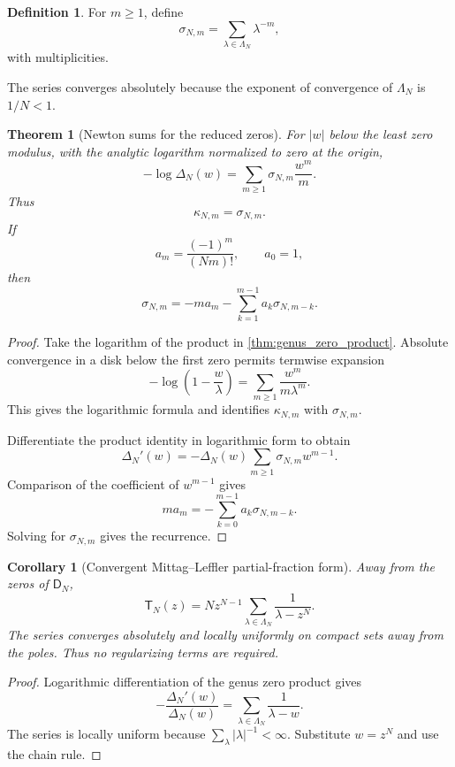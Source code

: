 \documentclass[11pt,letterpaper]{article}
\newtheorem{theorem}{Theorem}[section]
\newtheorem{corollary}[corollary]{Corollary}
\theoremstyle{definition}
\newtheorem{definition}[definition]{Definition}
\theoremstyle{remark}
\newcommand{\Dfun}{\mathsf D}
\newcommand{\Tfun}{\mathsf T}
\begin{document}
\begin{definition}\label{def:zero_power_sums}
For $m\geq1$, define
\[
\sigma_{N,m}
=
\sum_{\lambda\in\Lambda_N}\lambda^{-m},
\]
with multiplicities.
\end{definition}

The series converges absolutely because the exponent of convergence of $\Lambda_N$ is $1/N<1$.

\begin{theorem}[Newton sums for the reduced zeros]\label{thm:newton_sums}
For $|w|$ below the least zero modulus, with the analytic logarithm
normalized to zero at the origin,
\[
-\log\Delta_N(w)
=
\sum_{m\geq1}\sigma_{N,m}\frac{w^m}{m}.
\]
Thus
\[
\kappa_{N,m}=\sigma_{N,m}.
\]
If
\[
a_m=\frac{(-1)^m}{(Nm)!},
\qquad a_0=1,
\]
then
\[
\sigma_{N,m}
=
-ma_m-
\sum_{k=1}^{m-1}a_k\sigma_{N,m-k}.
\]
\end{theorem}

\begin{proof}
Take the logarithm of the product in \cref{thm:genus_zero_product}.  Absolute convergence in a disk below the first zero permits termwise expansion
\[
-\log\left(1-\frac w\lambda\right)
=
\sum_{m\geq1}\frac{w^m}{m\lambda^m}.
\]
This gives the logarithmic formula and identifies $\kappa_{N,m}$ with $\sigma_{N,m}$.

Differentiate the product identity in logarithmic form to obtain
\[
\Delta_N'(w)
=
-\Delta_N(w)
\sum_{m\geq1}\sigma_{N,m}w^{m-1}.
\]
Comparison of the coefficient of $w^{m-1}$ gives
\[
ma_m
=
-\sum_{k=0}^{m-1}a_k\sigma_{N,m-k}.
\]
Solving for $\sigma_{N,m}$ gives the recurrence.
\end{proof}



\begin{corollary}[Convergent Mittag--Leffler partial-fraction form]\label{cor:mittag_leffler_tangent}
Away from the zeros of $\Dfun_N$,
\[
\Tfun_N(z)
=
Nz^{N-1}
\sum_{\lambda\in\Lambda_N}
\frac1{\lambda-z^N}.
\]
The series converges absolutely and locally uniformly on compact sets
away from the poles.  Thus no regularizing terms are required.
\end{corollary}

\begin{proof}
Logarithmic differentiation of the genus zero product gives
\[
-\frac{\Delta_N'(w)}{\Delta_N(w)}
=
\sum_{\lambda\in\Lambda_N}\frac1{\lambda-w}.
\]
The series is locally uniform because $\sum_{\lambda}|\lambda|^{-1}<\infty$.  Substitute $w=z^N$ and use the chain rule.
\end{proof}
\end{document}
